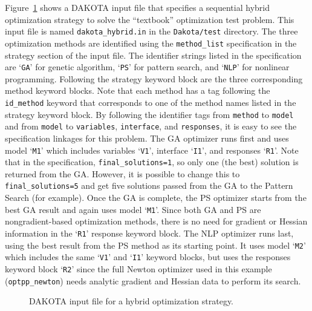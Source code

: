 
Figure~\ref{strat:figure01} shows a DAKOTA input file that specifies
a sequential hybrid optimization strategy to solve the
``textbook'' optimization test problem. This input file is named
\texttt{dakota\_hybrid.in} in the \texttt{Dakota/test} directory.
The three optimization methods are identified using the
\texttt{method\_list} specification in the strategy section of the
input file. The identifier strings listed in the specification are
`\texttt{GA}' for genetic algorithm, `\texttt{PS}' for pattern search,
and `\texttt{NLP}' for nonlinear programming. Following the strategy
keyword block are the three corresponding method keyword blocks. Note
that each method has a tag following the \texttt{id\_method} keyword
that corresponds to one of the method names listed in the strategy
keyword block. By following the identifier tags from \texttt{method}
to \texttt{model} and from \texttt{model} to \texttt{variables},
\texttt{interface}, and \texttt{responses}, it is easy to see the
specification linkages for this problem. The GA optimizer runs first
and uses model `\texttt{M1}' which includes variables `\texttt{V1}',
interface `\texttt{I1}', and responses `\texttt{R1}'. 
Note that in the specification, \texttt{final\_solutions=1}, 
so only one (the best) solution is returned from the GA.  
However, it is possible to change this to \texttt{final\_solutions=5}
and get five solutions passed from the GA to the Pattern Search
(for example).  Once the GA is complete, the PS optimizer starts from the 
best GA result and again
uses model `\texttt{M1}'. Since both GA and PS are nongradient-based
optimization methods, there is no need for gradient or Hessian
information in the `\texttt{R1}' response keyword block. The NLP
optimizer runs last, using the best result from the PS method as its
starting point.  It uses model `\texttt{M2}' which includes the same
`\texttt{V1}' and `\texttt{I1}' keyword blocks, but uses the responses
keyword block `\texttt{R2}' since the full Newton optimizer used in
this example (\texttt{optpp\_newton}) needs analytic gradient and
Hessian data to perform its search.
\begin{figure}
  \centering
  \begin{bigbox}
    \begin{tiny}
    \end{tiny}
  \end{bigbox}
  \caption{DAKOTA input file for a hybrid optimization strategy.}
  \label{strat:figure01}
\end{figure}

